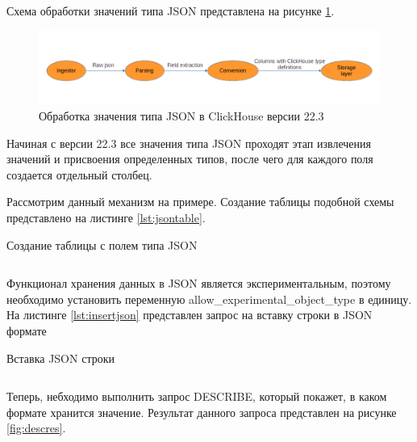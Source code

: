 \documentclass[14pt, russian]{scrartcl}
\begin{document}
Схема обработки значений типа JSON представлена на рисунке \ref{fig:jsonprocessing}.

\begin{figure}[H]
	\centering
	\begin{minipage}[t]{.9\textwidth}
		\centering
		\includegraphics[width=.7\textwidth]{./imgs/ingestion_process_crop.png}
	\end{minipage}
	\caption{Обработка значения типа JSON в ClickHouse версии 22.3}
	\label{fig:jsonprocessing}
\end{figure}

Начиная с версии 22.3 все значения типа JSON проходят
этап извлечения значений и присвоения определенных типов,
после чего для каждого поля создается отдельный столбец.

Рассмотрим данный механизм на примере. Создание таблицы подобной
схемы представлено на листинге \ref{lst:jsontable}.


\begin{listing}[H]
	\caption{Создание таблицы с полем типа JSON}
	\label{lst:jsontable}
	\inputminted[style=bw, frame=single,fontsize = \footnotesize, linenos=false, xleftmargin = 1.5em]{sql}{./listings/jsontable.sql}
\end{listing}

Функционал хранения данных в JSON является экспериментальным, поэтому
необходимо установить переменную allow\_experimental\_object\_type в единицу.
На листинге \ref{lst:insertjson} представлен запрос
на вставку строки в JSON формате

\begin{listing}[H]
	\caption{Вставка JSON строки}
	\label{lst:insertjson}
	\inputminted[breaklines=true, style=bw, frame=single,fontsize = \footnotesize, linenos=false, xleftmargin = 1.5em]{sql}{./listings/inserjson.sql}
\end{listing}

Теперь, небходимо выполнить запрос DESCRIBE, который
покажет, в каком формате хранится значение. Результат
данного запроса представлен на рисунке \ref{fig:descres}.
\end{document}
